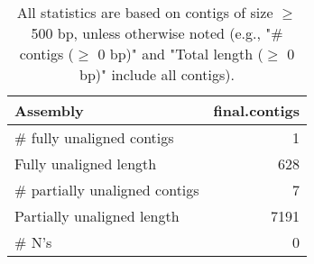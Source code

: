 \documentclass[12pt,a4paper]{article}
\begin{document}
\begin{table}[ht]
\begin{center}
\caption{All statistics are based on contigs of size $\geq$ 500 bp, unless otherwise noted (e.g., "\# contigs ($\geq$ 0 bp)" and "Total length ($\geq$ 0 bp)" include all contigs).}
\begin{tabular}{|l*{1}{|r}|}
\hline
Assembly & final.contigs \\ \hline
\# fully unaligned contigs & 1 \\ \hline
Fully unaligned length & 628 \\ \hline
\# partially unaligned contigs & 7 \\ \hline
Partially unaligned length & 7191 \\ \hline
\# N's & 0 \\ \hline
\end{tabular}
\end{center}
\end{table}
\end{document}

